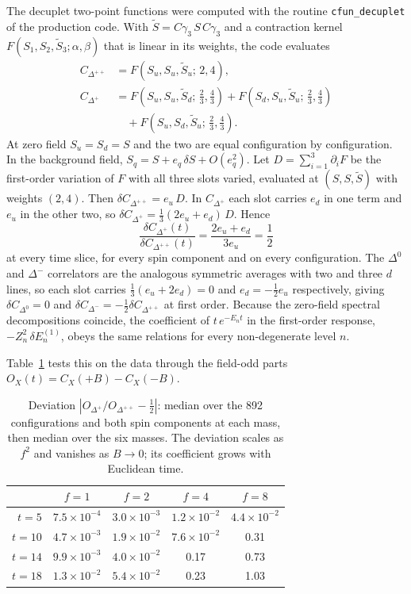 \documentclass[aps,prd,reprint,twocolumn,superscriptaddress,nofootinbib,longbibliography]{revtex4-2}
\begin{document}
The decuplet two-point functions were computed with the routine \texttt{cfun\_decuplet} of the production code. With $\tilde S=C\gamma_3\,S\,C\gamma_3$ and a contraction kernel $F(S_1,S_2,\tilde S_3;\alpha,\beta)$ that is linear in its weights, the code evaluates
\begin{align}
C_{\Delta^{++}}&=F(S_u,S_u,\tilde S_u;\,2,4),\\
C_{\Delta^{+}}&=F(S_u,S_u,\tilde S_d;\,\tfrac23,\tfrac43)+F(S_d,S_u,\tilde S_u;\,\tfrac23,\tfrac43)\nonumber\\&\quad+F(S_u,S_d,\tilde S_u;\,\tfrac23,\tfrac43).
\end{align}
At zero field $S_u=S_d=S$ and the two are equal configuration by configuration. In the background field, $S_q=S+e_q\,\delta S+O(e_q^2)$. Let $D=\sum_{i=1}^3\partial_iF$ be the first-order variation of $F$ with all three slots varied, evaluated at $(S,S,\tilde S)$ with weights $(2,4)$. Then $\delta C_{\Delta^{++}}=e_u\,D$. In $C_{\Delta^+}$ each slot carries $e_d$ in one term and $e_u$ in the other two, so $\delta C_{\Delta^{+}}=\tfrac13(2e_u+e_d)\,D$. Hence
\begin{equation}
\frac{\delta C_{\Delta^{+}}(t)}{\delta C_{\Delta^{++}}(t)}=\frac{2e_u+e_d}{3e_u}=\frac12
\end{equation}
at every time slice, for every spin component and on every configuration. The $\Delta^0$ and $\Delta^-$ correlators are the analogous symmetric averages with two and three $d$ lines, so each slot carries $\tfrac13(e_u+2e_d)=0$ and $e_d=-\tfrac12e_u$ respectively, giving $\delta C_{\Delta^0}=0$ and $\delta C_{\Delta^-}=-\tfrac12\delta C_{\Delta^{++}}$ at first order. Because the zero-field spectral decompositions coincide, the coefficient of $t\,e^{-E_nt}$ in the first-order response, $-Z_n^2\,\delta E_n^{(1)}$, obeys the same relations for every non-degenerate level $n$.

Table~\ref{tab:identitycheck} tests this on the data through the field-odd parts $O_X(t)=C_X(+B)-C_X(-B)$.

\begin{table}[h]
\caption{Deviation $|O_{\Delta^+}/O_{\Delta^{++}}-\tfrac12|$: median over the 892 configurations and both spin components at each mass, then median over the six masses. The deviation scales as $f^2$ and vanishes as $B\to0$; its coefficient grows with Euclidean time.}
\label{tab:identitycheck}
\centering
\begin{tabular}{rcccc}
\toprule
& $f=1$ & $f=2$ & $f=4$ & $f=8$\\
\midrule
$t=5$  & $7.5\times10^{-4}$ & $3.0\times10^{-3}$ & $1.2\times10^{-2}$ & $4.4\times10^{-2}$\\
$t=10$ & $4.7\times10^{-3}$ & $1.9\times10^{-2}$ & $7.6\times10^{-2}$ & 0.31\\
$t=14$ & $9.9\times10^{-3}$ & $4.0\times10^{-2}$ & 0.17 & 0.73\\
$t=18$ & $1.3\times10^{-2}$ & $5.4\times10^{-2}$ & 0.23 & 1.03\\
\bottomrule
\end{tabular}
\end{table}
\end{document}

